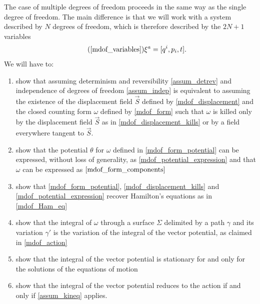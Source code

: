 \documentclass[10pt,twocolumn, nofootinbib]{revtex4-2}
\begin{document}
The case of multiple degrees of freedom proceeds in the same way as the single degree of freedom. The main difference is that we will work with a system described by $N$ degrees of freedom, which is therefore described by the $2N+1$ variables
\begin{equation}
\tag*{(\ref{mdof_variables})}
	\xi^a = [ q^i, p_i, t].
\end{equation}
We will have to:
\begin{enumerate}[label=(\roman*)]
	\item show that assuming determinism and reversibility \ref{assum_detrev} and independence of degrees of freedom \ref{assum_indep} is equivalent to assuming the existence of the displacement field $\vec{S}$ defined by \ref{mdof_displacement} and the closed counting form $\omega$ defined by \ref{mdof_form} such that $\omega$ is killed only by the displacement field $\vec{S}$ as in \ref{mdof_displacement_kills} or by a field everywhere tangent to $\vec{S}$.
	\item show that the potential $\theta$ for $\omega$ defined in \ref{mdof_form_potential} can be expressed, without loss of generality, as \ref{mdof_potential_expression} and that $\omega$ can be expressed as $\ref{mdof_form_components}$
	\item show that \ref{mdof_form_potential}, \ref{mdof_displacement_kills} and \ref{mdof_potential_expression} recover Hamilton's equations as in \ref{mdof_Ham_eq}
	\item show that the integral of $\omega$ through a surface $\Sigma$ delimited by a path $\gamma$ and its variation $\gamma'$ is the variation of the integral of the vector potential, as claimed in \ref{mdof_action}
	\item show that the integral of the vector potential is stationary for and only for the solutions of the equations of motion
	\item show that the integral of the vector potential reduces to the action if and only if \ref{assum_kineq} applies.
\end{enumerate}
\end{document}
